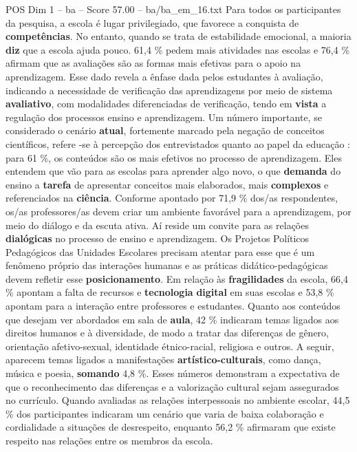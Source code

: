 \begin{textsample}{POS Dim 1 – ba – Score 57.00 – ba/ba\_em\_16.txt}
Para todos os participantes da pesquisa, a escola é lugar privilegiado, que favorece a conquista de \textbf{competências}.
No entanto, quando se trata de estabilidade emocional, a maioria \textbf{diz} que a escola ajuda pouco. 61,4 \% pedem mais atividades nas escolas e 76,4 \% afirmam que as avaliações são as formas mais efetivas para o apoio na aprendizagem.
Esse dado revela a ênfase dada pelos estudantes à avaliação, indicando a necessidade de verificação das aprendizagens por meio de sistema \textbf{avaliativo}, com modalidades diferenciadas de verificação, tendo em \textbf{vista} a regulação dos processos ensino e aprendizagem.
Um número importante, se considerado o cenário \textbf{atual}, fortemente marcado pela negação de conceitos científicos, refere -se à percepção dos entrevistados quanto ao papel da educação : para 61 \%, os conteúdos são os mais efetivos no processo de aprendizagem.
Eles entendem que vão para as escolas para aprender algo novo, o que \textbf{demanda} do ensino a \textbf{tarefa} de apresentar conceitos mais elaborados, mais \textbf{complexos} e referenciados na \textbf{ciência}.
Conforme apontado por 71,9 \% dos/as respondentes, os/as professores/as devem criar um ambiente favorável para a aprendizagem, por meio do diálogo e da escuta ativa.
Aí reside um convite para as relações \textbf{dialógicas} no processo de ensino e aprendizagem.
Os Projetos Políticos Pedagógicos das Unidades Escolares precisam atentar para esse que é um fenômeno próprio das interações humanas e as práticas didático-pedagógicas devem refletir esse \textbf{posicionamento}.
Em relação às \textbf{fragilidades} da escola, 66,4 \% apontam a falta de recursos e \textbf{tecnologia} \textbf{digital} em suas escolas e 53,8 \% apontam para a interação entre professores e estudantes.
Quanto aos conteúdos que desejam ver abordados em sala de \textbf{aula}, 42 \% indicaram temas ligados aos direitos humanos e à diversidade, de modo a tratar das diferenças de gênero, orientação afetivo-sexual, identidade étnico-racial, religiosa e outros.
A seguir, aparecem temas ligados a manifestações \textbf{artístico-culturais}, como dança, música e poesia, \textbf{somando} 4,8 \%.
Esses números demonstram a expectativa de que o reconhecimento das diferenças e a valorização cultural sejam assegurados no currículo.
Quando avaliadas as relações interpessoais no ambiente escolar, 44,5 \% dos participantes indicaram um cenário que varia de baixa colaboração e cordialidade a situações de desrespeito, enquanto 56,2 \% afirmaram que existe respeito nas relações entre os membros da escola.

\end{textsample}
